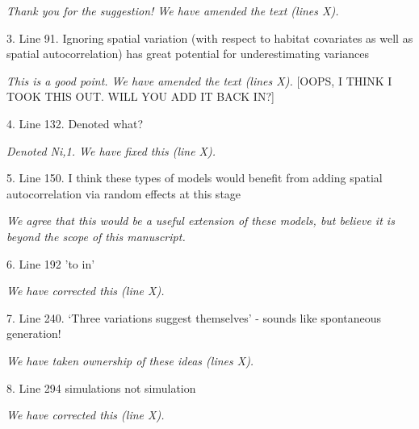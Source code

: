 \documentclass[12pt,english]{article}
\begin{document}
\begin{spacing}{1.9}
\begin{flushleft}
\textit{Thank you for the suggestion!  We have amended the text (lines X).}

3. Line 91. Ignoring spatial variation (with respect to habitat covariates as well as spatial autocorrelation) has great potential for underestimating variances

\textit{This is a good point.  We have amended the text (lines X).} [OOPS, I THINK I TOOK THIS OUT. WILL YOU ADD IT BACK IN?]

4. Line 132. Denoted what?

\textit{Denoted Ni,1.  We have fixed this (line X).}

5. Line 150. I think these types of models would benefit from adding spatial autocorrelation via random effects at this stage

\textit{We agree that this would be a useful extension of these models, but believe it is beyond the scope of this manuscript.}

6. Line 192 'to in'

\textit{We have corrected this (line X).}

7. Line 240. `Three variations suggest themselves' - sounds like spontaneous generation!

\textit{We have taken ownership of these ideas (lines X).}

8. Line 294 simulations not simulation

\textit{We have corrected this (line X).}
\end{flushleft}
\end{spacing}
\end{document}
